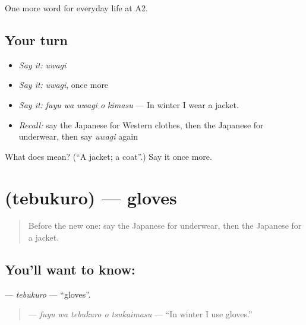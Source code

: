 \begin{grammarlens}[title={What you've built}]
One more word for everyday life at A2.
\end{grammarlens}

\subsection*{Your turn}
\begin{itemize}
\raggedright
  \item \emph{Say it:} \emph{uwagi}
  \item \emph{Say it:} \emph{uwagi}, once more
  \item \emph{Say it:} \emph{fuyu wa uwagi o kimasu} — In winter I wear a jacket.
  \item \emph{Recall:} say the Japanese for Western clothes, then the Japanese for underwear, then say \emph{uwagi} again
\end{itemize}

\begin{tcolorbox}[breakable,colback=teal!4,colframe=teal!35!black,title={Before you move on}]
What does  mean? (\textquotedblleft{}A jacket; a coat\textquotedblright{}.) Say it once more.
\end{tcolorbox}
\section[\texorpdfstring{\ja{てぶくろ} (tebukuro)}{てぶくろ (tebukuro)}]{ (tebukuro) — gloves}

\label{lesson:JA-C150-tebukuro}



\begin{quote}
Before the new one: say the Japanese for underwear, then the Japanese for a jacket.
\end{quote}

\subsection*{You'll want to know: }
\textbf{} — \emph{tebukuro} — \textquotedblleft{}gloves\textquotedblright{}.

\begin{quote}
\textbf{  } — \emph{fuyu wa tebukuro o tsukaimasu} — \textquotedblleft{}In winter I use gloves.\textquotedblright{}
\end{quote}

